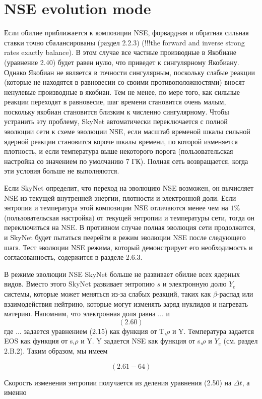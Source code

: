 \documentclass[%
bachelor,    %
natbib,      %
subf,        %
href,        %
colorlinks,  %
]{disser}
\begin{document}
\section{NSE evolution mode}
Если обилие приближается к композиции NSE, форвардная и обратная сильная ставки точно сбалансированы (раздел 2.2.3) (!!!the forward and inverse strong rates exactly balance). В этом случае все частные производные в Якобиане (уравнение 2.40) будет равен нулю, что приведет к сингулярному Якобиану. Однако Якобиан не является в точности сингулярным, поскольку слабые реакции (которые не находятся в равновесии со своими противоположностями) вносят ненулевые производные в якобиан. Тем не менее, по мере того, как сильные реакции переходят в равновесие, шаг времени становится очень малым, поскольку якобиан становится близким к численно сингулярному. Чтобы устранить эту проблему, SkyNet автоматически переключается с полной эволюции сети к схеме эволюции NSE, если масштаб временой шкалы сильной ядерной реакции становится короче шкалы времени, по которой изменяется плотность, и если температура выше некоторого порога (пользовательская настройка со значением по умолчанию 7 ГК). Полная сеть возвращается, когда эти условия больше не выполняются.

Если SkyNet определит, что переход на эволюцию NSE возможен, он вычисляет NSE из текущей внутренней энергии, плотности и электронной доли. Если энтропия и температура этой композиции NSE отличаются менее чем на $1\%$ (пользовательская настройка) от текущей энтропии и температуры сети, тогда он переключиться на NSE. В противном случае полная эволюция сети продолжится, и SkyNet будет пытаться пеерейти в режим эволюции NSE после следующего шага. Тест эволюции NSE режима, который демонстрирует его необходимость и согласованность, содержится в разделе 2.6.3.

В режиме эволюции NSE SkyNet больше не развивает обилие всех ядерных видов. Вместо этого SkyNet развивает энтропию $s$ и электронную долю $Y_e$ системы, которые может меняться из-за слабых реакций, таких как $\beta$-распад или взаимодействия нейтрино, которые могут изменять заряд нуклидов и нагревать материю. Напомним, что электронная доля равна $...$ и 
$$(2.60)$$
где $...$ задается уравнением (2.15) как функция от T,$\rho$ и Y. Температура задается EOS как функция от s,$\rho$ и Y. Y задается NSE как функция от s,$\rho$ и $Y_e$ (см. раздел 2.B.2). Таким образом, мы имеем

$$(2.61 - 64)$$

Скорость изменения энтропии получается из деления уравнения (2.50) на $\Delta t$,
а именно
\end{document}
